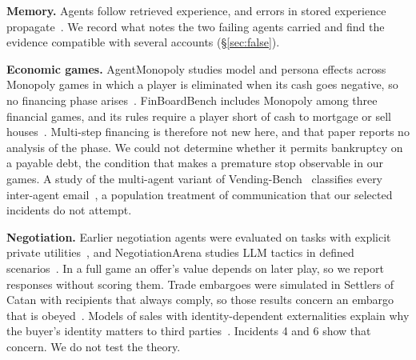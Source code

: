 \textbf{Memory.} Agents follow retrieved experience, and errors in stored experience propagate~\cite{xiong2026memory}. We record what notes the two failing agents carried and find the evidence compatible with several accounts (\S\ref{sec:false}).

\textbf{Economic games.} AgentMonopoly studies model and persona effects across Monopoly games in which a player is eliminated when its cash goes negative, so no financing phase arises~\cite{wu2026agentmonopoly}. FinBoardBench includes Monopoly among three financial games, and its rules require a player short of cash to mortgage or sell houses~\cite{hu2026finboardbench}. Multi-step financing is therefore not new here, and that paper reports no analysis of the phase. We could not determine whether it permits bankruptcy on a payable debt, the condition that makes a premature stop observable in our games. A study of the multi-agent variant of Vending-Bench~\cite{backlund2025vendingbench} classifies every inter-agent email~\cite{li2026arena}, a population treatment of communication that our selected incidents do not attempt.

\textbf{Negotiation.} Earlier negotiation agents were evaluated on tasks with explicit private utilities~\cite{lewis2017deal,he2018decoupling}, and NegotiationArena studies LLM tactics in defined scenarios~\cite{bianchi2024negotiationarena}. In a full game an offer's value depends on later play, so we report responses without scoring them. Trade embargoes were simulated in Settlers of Catan with recipients that always comply, so those results concern an embargo that is obeyed~\cite{guhe2014persuasion}. Models of sales with identity-dependent externalities explain why the buyer's identity matters to third parties~\cite{jehiel1996externalities}. Incidents 4 and 6 show that concern. We do not test the theory.
